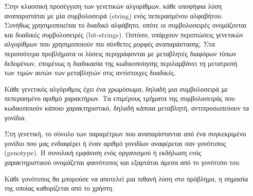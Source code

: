 Στην κλασσική προσέγγιση των γενετικών αλγορίθμων, κάθε υποψήφια λύση αναπαριστάται με μία συμβολοσειρά (string) ενός πεπερασμένου αλφαβήτου. Συνήθως χρησιμοποιείται το δυαδικό αλφάβητο, οπότε οι συμβολοσειρές ονομάζονται και δυαδικές συμβολοσειρές (bit-strings). Ωστόσο, υπάρχουν περιπτώσεις γενετικών αλγορίθμων που χρησιμοποιούν πιο σύνθετες μορφές αναπαράστασης. Στα περισσότερα προβλήματα οι λύσεις περιγράφονται με μεταβλητές διαφόρων τύπων δεδομένων, επομένως η διαδικασία της κωδικοποίησης περιλαμβάνει τη μετατροπή των τιμών αυτών των μεταβλητών στις αντίστοιχες δυαδικές.

Κάθε γενετικός αλγόριθμος έχει ένα χρωμόσωμα, δηλαδή μια συμβολοσειρά με πεπερασμένο αριθμό χαρακτήρων. Τα επιμέρους τμήματα της συμβολοσειράς που κωδικοποιούν κάποιο χαρακτηριστικό, δηλαδή κάποια μεταβλητή, αντιπροσωπεύουν τα γονίδια.

Στη γενετική, το σύνολο των παραμέτρων που αναπαρίστανται από ένα συγκεκριμένο γονίδιο που μας ενδιαφέρει ή έναν αριθμό γονιδίων αναφέρεται σαν γονότυπος (genotype). Η συνολική εμφάνιση ενός οργανισμού ή εκδήλωση ενός χαρακτηριστικού ονομάζεται φαινότυπος και εξαρτάται άμεσα από το γονότυπο του.

Κάθε γονότυπος θα μπορούσε να αποτελεί μια πιθανή λύση στο πρόβλημα, η σημασία της οποίας καθορίζεται από το χρήστη.